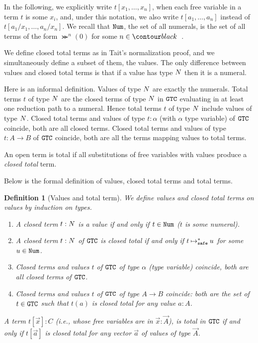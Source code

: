 \documentclass{article}
\newtheorem{definition}[theorem]{Definition}
\begin{document}
In the following, we explicitly write $t[x_1,\ldots,x_n]$,
when each free variable in  a term $t$ is some $x_i$, 
and, under this notation, we also write $t[a_1,\ldots,a_n]$ instead of $t[a_1/x_1,\ldots,a_n/x_n]$. 
We recall that ${\tt Num}$, the set of all numerals, is the set of all terms of the form
$\Succ^n(0)$ for some $n\in \Nat$.

We define closed total terms as in Tait's normalization proof, and we simultaneously 
define a subset of them, the values.
The only difference between values and closed total terms 
is that if a value has type ${N}$ then it is a numeral.

Here is an informal definition. Values of type ${N}$ are exactly the numerals. 
Total terms $t$ of type ${N}$ are
the closed terms of type ${N}$ in ${\tt GTC}$ evaluating in at least one reduction path to a numeral. 
Hence total terms $t$ of type ${N}$ include values of type ${N}$. 
Closed total terms and values of type $t:\alpha$ (with $\alpha$ type variable) of ${\tt GTC}$ coincide, 
both are all closed terms.
Closed total terms and values of type $t:A \rightarrow B$ of ${\tt GTC}$ coincide, 
both are all the terms mapping values to total terms. 

An open term is total if all substitutions of free variables with values produce a \emph{closed total} term.

Below is the formal definition of values, closed total terms and total terms.

\begin{definition}[Values and total term]
  We define values and closed total terms on values by induction on types. 
  \begin{enumerate}
  \item
    A closed term $t:{N}$ is a \emph{value} if and only if $t \in {\tt Num}$ ($t$ is some numeral).
  \item
    A closed term $t:{N}$ of ${\tt GTC}$ is \emph{closed total}
    if and only if $t \mathbin{\mathbin{\mapsto}_{\hbox{\scriptsize \tt safe}}^*} u$ for some $u\in {\tt Num}$.
  \item
    Closed terms and values $t$ of ${\tt GTC}$ of type $\alpha$ (type variable) coincide, 
    both are all closed terms of ${\tt GTC}$.
   \item
    Closed terms and values $t$ of ${\tt GTC}$ of type $A\rightarrow B$ coincide:
    both are the set of $t \in {\tt GTC}$ such that $t(a)$ is closed total for any value $a:A$.
   \end{enumerate}
   A term $t[\vec{x}]:C$ (i.e., whose free variables are in $\vec{x}:\vec{A}$), is \emph{total} in ${\tt GTC}$
   if and only if $t[\vec{a}]$ is closed total for any vector $\vec{a}$ of values of type $\vec{A}$.
\end{definition}
\end{document}
